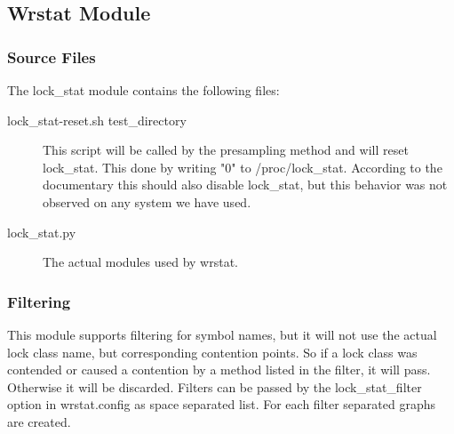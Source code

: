 \subsection{Wrstat Module}
    \subsubsection{Source Files}
    The lock\_stat module contains the following files:
    \begin{description}
        \item[lock\_stat-reset.sh test\_directory]
            This script will be called by the presampling method and will reset lock\_stat.
            This done by writing "0" to /proc/lock\_stat.
            According to the documentary this should also disable lock\_stat, but this 
            behavior was not observed on any system we have used.

        \item[lock\_stat.py]
            The actual modules used by wrstat.
    \end{description}

    \subsubsection{Filtering}
    This module supports filtering for symbol names, but it will not use
    the actual lock class name, but corresponding contention points. So if a lock class
    was contended or caused a contention by a method listed in the filter, it will pass.
    Otherwise it will be discarded.
    Filters can be passed by the lock\_stat\_filter option in wrstat.config as space separated list.
    For each filter separated graphs are created.

